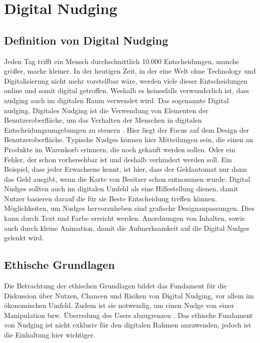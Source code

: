 \chapter{Digital Nudging}
\section{Definition von Digital Nudging}
Jeden Tag trifft ein Mensch durchschnittlich 10.000 Entscheidungen, manche größer, mache kleiner. In der heutigen Zeit, in der eine Welt ohne Technology und Digitalisierung nicht mehr vorstellbar wäre, werden viele dieser Entscheidungen online und somit digital getroffen. Weshalb es keinesfalls verwunderlich ist, dass nudging auch im digitalen Raum verwendet wird. Das sogenannte Digital nudging. Digitales Nudging ist die Verwendung von Elementen der Benutzeroberfläche, um das Verhalten der Menschen in digitalen Entscheidungsumgebungen zu steuern \parencite[]{Weinmann.2016}. Hier liegt der Focus auf dem Design der Benutzeroberfläche. Typische Nudges können hier Mitteilungen sein, die einen an Produkte im Warenkorb erinnern, die noch gekauft werden sollen. Oder ein Fehler, der schon vorhersehbar ist und deshalb verhindert werden soll. Ein Beispiel, dass jeder Erwachsene kennt, ist hier, dass der Geldautomat nur dann das Geld ausgibt, wenn die Karte von Besitzer schon entnommen wurde.
Digital Nudges sollten auch im digitalen Umfeld als eine Hilfestellung dienen, damit Nutzer basieren darauf die für sie Beste Entscheidung treffen können. 
Möglichkeiten, um Nudges hervorzuheben sind grafische Designanpassungen. Dies kann durch Text und Farbe erreicht werden. Anordnungen von Inhalten, sowie auch durch kleine Animation, damit die Aufmerksamkeit auf die Digital Nudges gelenkt wird.

\section{Ethische Grundlagen}
Die Betrachtung der ethischen Grundlagen bildet das Fundament für die Diskussion über Nutzen, Chancen und Risiken von Digital Nudging, vor allem im ökonomischen Umfeld. Zudem ist sie notwendig, um einen Nudge von einer Manipulation bzw. Überredung des Users abzugrenzen \parencite[S. 3]{Jesse.2021}. Das ethische Fundament von Nudging ist nicht exklusiv für den digitalen Rahmen anzuwenden, jedoch ist die Einhaltung hier wichtiger.

